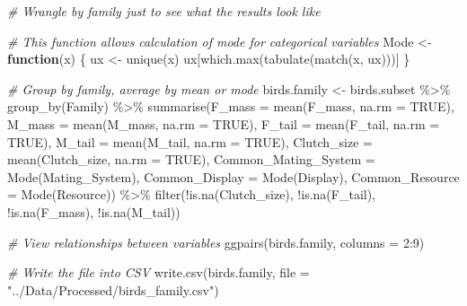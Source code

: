\documentclass[
  12pt,
]{article}
\newenvironment{Shaded}{\begin{snugshade}}{\end{snugshade}}
\newcommand{\AttributeTok}[1]{\textcolor[rgb]{0.77,0.63,0.00}{#1}}
\newcommand{\CommentTok}[1]{\textcolor[rgb]{0.56,0.35,0.01}{\textit{#1}}}
\newcommand{\ConstantTok}[1]{\textcolor[rgb]{0.00,0.00,0.00}{#1}}
\newcommand{\ControlFlowTok}[1]{\textcolor[rgb]{0.13,0.29,0.53}{\textbf{#1}}}
\newcommand{\DecValTok}[1]{\textcolor[rgb]{0.00,0.00,0.81}{#1}}
\newcommand{\FunctionTok}[1]{\textcolor[rgb]{0.00,0.00,0.00}{#1}}
\newcommand{\NormalTok}[1]{#1}
\newcommand{\OtherTok}[1]{\textcolor[rgb]{0.56,0.35,0.01}{#1}}
\newcommand{\SpecialCharTok}[1]{\textcolor[rgb]{0.00,0.00,0.00}{#1}}
\newcommand{\StringTok}[1]{\textcolor[rgb]{0.31,0.60,0.02}{#1}}
\begin{document}
\begin{Shaded}
\begin{Highlighting}[]
\CommentTok{\# Wrangle by family just to see what the results look like}

\CommentTok{\# This function allows calculation of mode for categorical variables}
\NormalTok{Mode }\OtherTok{\textless{}{-}} \ControlFlowTok{function}\NormalTok{(x) \{}
\NormalTok{  ux }\OtherTok{\textless{}{-}} \FunctionTok{unique}\NormalTok{(x) }
\NormalTok{  ux[}\FunctionTok{which.max}\NormalTok{(}\FunctionTok{tabulate}\NormalTok{(}\FunctionTok{match}\NormalTok{(x, ux)))]}
\NormalTok{\}}

\CommentTok{\# Group by family, average by mean or mode}
\NormalTok{birds.family }\OtherTok{\textless{}{-}}\NormalTok{ birds.subset }\SpecialCharTok{\%\textgreater{}\%}
  \FunctionTok{group\_by}\NormalTok{(Family) }\SpecialCharTok{\%\textgreater{}\%} 
  \FunctionTok{summarise}\NormalTok{(}\AttributeTok{F\_mass =} \FunctionTok{mean}\NormalTok{(F\_mass, }\AttributeTok{na.rm =} \ConstantTok{TRUE}\NormalTok{),}
            \AttributeTok{M\_mass =} \FunctionTok{mean}\NormalTok{(M\_mass, }\AttributeTok{na.rm =} \ConstantTok{TRUE}\NormalTok{),}
            \AttributeTok{F\_tail =} \FunctionTok{mean}\NormalTok{(F\_tail, }\AttributeTok{na.rm =} \ConstantTok{TRUE}\NormalTok{),}
            \AttributeTok{M\_tail =} \FunctionTok{mean}\NormalTok{(M\_tail, }\AttributeTok{na.rm =} \ConstantTok{TRUE}\NormalTok{),}
            \AttributeTok{Clutch\_size =} \FunctionTok{mean}\NormalTok{(Clutch\_size, }\AttributeTok{na.rm =} \ConstantTok{TRUE}\NormalTok{),}
            \AttributeTok{Common\_Mating\_System =} \FunctionTok{Mode}\NormalTok{(Mating\_System),}
            \AttributeTok{Common\_Display =} \FunctionTok{Mode}\NormalTok{(Display),}
            \AttributeTok{Common\_Resource =} \FunctionTok{Mode}\NormalTok{(Resource)) }\SpecialCharTok{\%\textgreater{}\%}
  \FunctionTok{filter}\NormalTok{(}\SpecialCharTok{!}\FunctionTok{is.na}\NormalTok{(Clutch\_size), }\SpecialCharTok{!}\FunctionTok{is.na}\NormalTok{(F\_tail), }
         \SpecialCharTok{!}\FunctionTok{is.na}\NormalTok{(F\_mass), }\SpecialCharTok{!}\FunctionTok{is.na}\NormalTok{(M\_tail))}

\CommentTok{\# View relationships between variables}
\FunctionTok{ggpairs}\NormalTok{(birds.family, }\AttributeTok{columns =} \DecValTok{2}\SpecialCharTok{:}\DecValTok{9}\NormalTok{)}

\CommentTok{\# Write the file into CSV}
\FunctionTok{write.csv}\NormalTok{(birds.family, }\AttributeTok{file =} \StringTok{"../Data/Processed/birds\_family.csv"}\NormalTok{)}
\end{Highlighting}
\end{Shaded}
\end{document}
